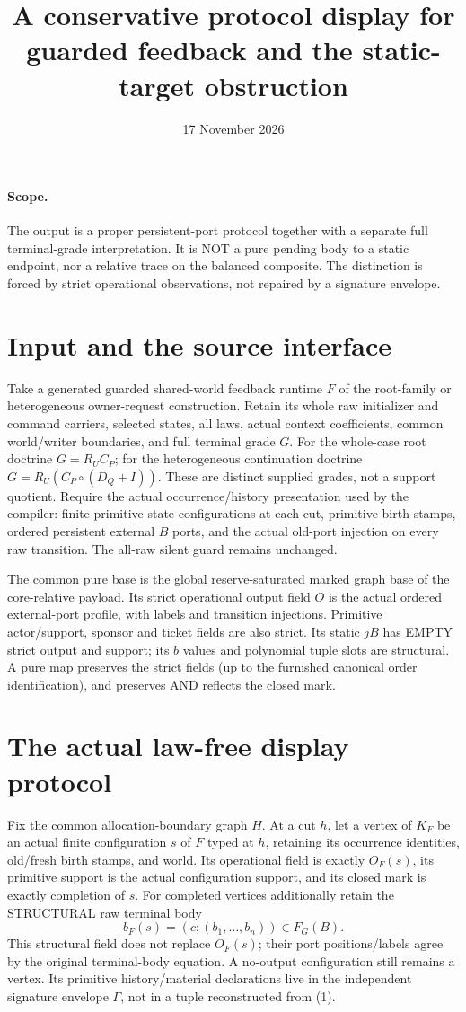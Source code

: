 \documentclass[11pt]{article}
\title{A conservative protocol display for guarded feedback and the static-target obstruction}
\date{17 November 2026}
\begin{document}
\maketitle
\paragraph{Scope.} The output is a proper persistent-port protocol together with a separate full terminal-grade interpretation. It is NOT a pure pending body to a static endpoint, nor a relative trace on the balanced composite. The distinction is forced by strict operational observations, not repaired by a signature envelope.

\section{Input and the source interface}
Take a generated guarded shared-world feedback runtime $F$ of the root-family or heterogeneous owner-request construction. Retain its whole raw initializer and command carriers, selected states, all laws, actual context coefficients, common world/writer boundaries, and full terminal grade $G$. For the whole-case root doctrine $G=R_U C_P$; for the heterogeneous continuation doctrine $G=R_U(C_P\circ(D_Q+I))$. These are distinct supplied grades, not a support quotient. Require the actual occurrence/history presentation used by the compiler: finite primitive state configurations at each cut, primitive birth stamps, ordered persistent external $B$ ports, and the actual old-port injection on every raw transition. The all-raw silent guard remains unchanged.

The common pure base is the global reserve-saturated marked graph base of the core-relative payload. Its strict operational output field $O$ is the actual ordered external-port profile, with labels and transition injections. Primitive actor/support, sponsor and ticket fields are also strict. Its static $jB$ has EMPTY strict output and support; its $b$ values and polynomial tuple slots are structural. A pure map preserves the strict fields (up to the furnished canonical order identification), and preserves AND reflects the closed mark.

\section{The actual law-free display protocol}
Fix the common allocation-boundary graph $H$. At a cut $h$, let a vertex of $K_F$ be an actual finite configuration $s$ of $F$ typed at $h$, retaining its occurrence identities, old/fresh birth stamps, and world. Its operational field is exactly $O_F(s)$, its primitive support is the actual configuration support, and its closed mark is exactly completion of $s$. For completed vertices additionally retain the STRUCTURAL raw terminal body
\[
                    b_F(s)=(c;(b_1,\ldots,b_n))\in F_G(B).      \tag{1}
\]
This structural field does not replace $O_F(s)$; their port positions/labels agree by the original terminal-body equation. A no-output configuration still remains a vertex. Its primitive history/material declarations live in the independent signature envelope $\Gamma$, not in a tuple reconstructed from (1).
\end{document}
